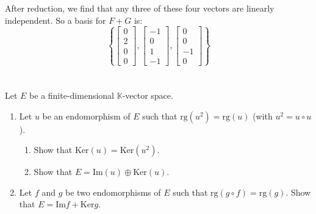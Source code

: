 \documentclass[12pt]{article}
\begin{document}
\begin{answerbox}
\begin{enumerate}
After reduction, we find that any three of these four vectors are linearly independent. So a basis for $ F + G $ is:
$$
\boxed{
\left\{
\begin{bmatrix}
0 \\ 2 \\ 0 \\ 0
\end{bmatrix},
\begin{bmatrix}
-1 \\ 0 \\ 1 \\ -1
\end{bmatrix},
\begin{bmatrix}
0 \\ 0 \\ -1 \\ 0
\end{bmatrix}
\right\}
}
$$
\end{enumerate}
\end{answerbox}


\newpage

\section{}
Let $E$ be a finite-dimensional $\mathbb{K}$-vector space.

\begin{enumerate}
    \item Let $u$ be an endomorphism of $E$ such that $\text{rg}(u^2) = \text{rg}(u)$ (with $u^2 = u \circ u$).
    \begin{enumerate}
        \item Show that $\text{Ker}(u) = \text{Ker}(u^2)$.
        \item Show that $E = \text{Im}(u) \oplus \text{Ker}(u)$.
    \end{enumerate}
    \item Let $f$ and $g$ be two endomorphisms of $E$ such that $\text{rg}(g \circ f) = \text{rg}(g)$.
    Show that $E = \text{Im}f + \text{Ker}g$.
\end{enumerate}

\newpage
\end{document}
